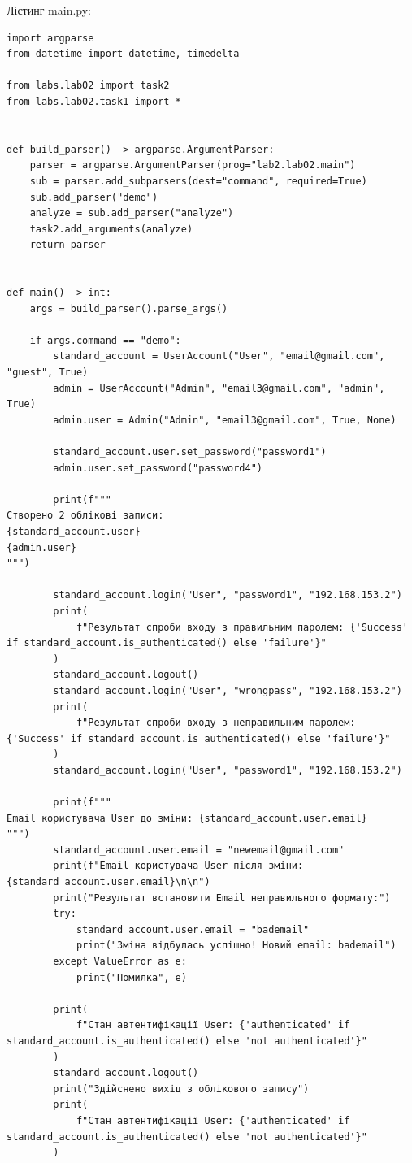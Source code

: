 \documentclass[10pt, a4paper]{article}
\begin{document}
Лістинг main.py:
\small\begin{lstlisting}
import argparse
from datetime import datetime, timedelta

from labs.lab02 import task2
from labs.lab02.task1 import *


def build_parser() -> argparse.ArgumentParser:
    parser = argparse.ArgumentParser(prog="lab2.lab02.main")
    sub = parser.add_subparsers(dest="command", required=True)
    sub.add_parser("demo")
    analyze = sub.add_parser("analyze")
    task2.add_arguments(analyze)
    return parser


def main() -> int:
    args = build_parser().parse_args()

    if args.command == "demo":
        standard_account = UserAccount("User", "email@gmail.com", "guest", True)
        admin = UserAccount("Admin", "email3@gmail.com", "admin", True)
        admin.user = Admin("Admin", "email3@gmail.com", True, None)

        standard_account.user.set_password("password1")
        admin.user.set_password("password4")

        print(f"""
Створено 2 облікові записи:
{standard_account.user}
{admin.user}
""")

        standard_account.login("User", "password1", "192.168.153.2")
        print(
            f"Результат спроби входу з правильним паролем: {'Success' if standard_account.is_authenticated() else 'failure'}"
        )
        standard_account.logout()
        standard_account.login("User", "wrongpass", "192.168.153.2")
        print(
            f"Результат спроби входу з неправильним паролем: {'Success' if standard_account.is_authenticated() else 'failure'}"
        )
        standard_account.login("User", "password1", "192.168.153.2")

        print(f"""
Email користувача User до зміни: {standard_account.user.email}
""")
        standard_account.user.email = "newemail@gmail.com"
        print(f"Email кориcтувача User після зміни: {standard_account.user.email}\n\n")
        print("Результат встановити Email неправильного формату:")
        try:
            standard_account.user.email = "bademail"
            print("Зміна відбулась успішно! Новий email: bademail")
        except ValueError as e:
            print("Помилка", e)

        print(
            f"Стан автентифікації User: {'authenticated' if standard_account.is_authenticated() else 'not authenticated'}"
        )
        standard_account.logout()
        print("Здійснено вихід з облікового запису")
        print(
            f"Стан автентифікації User: {'authenticated' if standard_account.is_authenticated() else 'not authenticated'}"
        )


\end{lstlisting}
\end{document}
